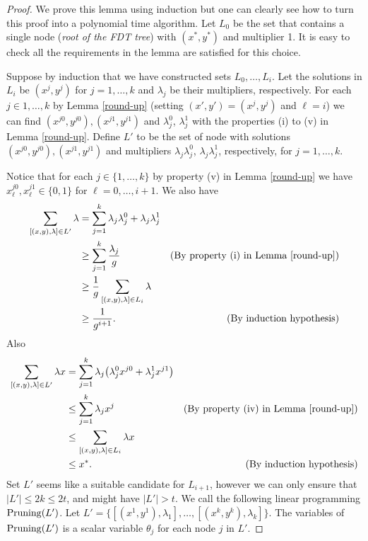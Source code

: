 \documentclass[runningheads]{llncs}
\begin{document}
\begin{proof}
	We prove this lemma using induction but one can clearly see how to turn this proof into a polynomial time algorithm. Let $L_0$ be the set that contains a single node (\textit{root of the FDT tree}) with $(x^*,y^*)$ and multiplier 1. It is easy to check all the requirements in the lemma are satisfied for this choice.
	
	Suppose by induction that we have constructed sets $L_0,\ldots,L_i$. Let the solutions in $L_i$ be $(x^j,y^j)$ for $j=1,\ldots,k$ and $\lambda_j$ be their multipliers, respectively. For each $j\in 1,\ldots,k$ by Lemma \ref{round-up} (setting $(x',y')= (x^j,y^j)$ and $\ell = i$) we can find $(x^{j0},y^{j0}), (x^{j1},y^{j1})$ and $\lambda^0_j$, $\lambda^1_j$ with the properties (i) to (v) in Lemma \ref{round-up}. Define $L'$ to be the set of node with solutions $(x^{j0},y^{j0}), (x^{j1},y^{j1})$ and multipliers  $\lambda_j\lambda^0_j$, $\lambda_j\lambda^1_j$, respectively, for $j=1,\ldots,k$.
	
	Notice that for each $j\in \{1,\ldots,k\}$ by property (v) in Lemma \ref{round-up} we have $x_\ell^{j0}, x_\ell^{j1}\in \{0,1\}$ for $\ell = 0,\ldots,i+1$. We also have
	\begin{align*}
		\sum_{[(x,y),\lambda]\in L'} \lambda & =  \sum_{j=1}^{k} \lambda_j\lambda^0_j+\lambda_j\lambda^1_j&\\
		& \geq \sum_{j=1}^{k} \frac{\lambda_j}{ g} & (\text{By property (i) in Lemma \ref{round-up}})\\
		& \geq \frac{1}{g} \sum_{[(x,y),\lambda]\in L_i}\lambda&\\
		& \geq \frac{1}{g^{i+1}}.&(\text{By induction hypothesis})	 
	\end{align*} 
	Also 
	\begin{align*}
		\sum_{[(x,y),\lambda]\in L'}\lambda x & =  \sum_{j=1}^{k} \lambda_j\big(\lambda^0_jx^{j0}+\lambda^1_jx^{j1}\big)&\\ 
		& \leq \sum_{j=1}^{k} \lambda_j x^j  & (\text{By property (iv) in Lemma \ref{round-up}})\\
		& \leq \sum_{[(x,y),\lambda]\in L_i}\lambda x&\\
		& \leq x^*.&(\text{By induction hypothesis})	 
	\end{align*} 
	Set $L'$ seems like a suitable candidate for $L_{i+1}$, however we can only ensure that $|L'|\leq 2k\leq 2t$, and might have $|L'|>t$. We call the following linear programming $\operatorname{Pruning}(L')$. Let $L' = \{[(x^1,y^1),\lambda_1],\ldots,[(x^k,y^k),\lambda_k]\}$. The variables of $\operatorname{Pruning}(L')$ is a scalar variable $\theta_j$ for each node $j$ in $L'$.  
	

\end{proof}
\end{document}

